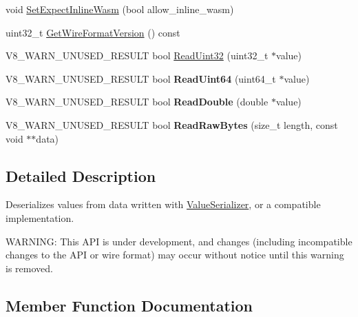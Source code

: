\begin{DoxyCompactItemize}
\item 
void \mbox{\hyperlink{classv8_1_1ValueDeserializer_a2e393ea834f217238fc144f48fd5caf1}{Set\+Expect\+Inline\+Wasm}} (bool allow\+\_\+inline\+\_\+wasm)
\item 
uint32\+\_\+t \mbox{\hyperlink{classv8_1_1ValueDeserializer_aaf8a206c11e0663105e570dd4feb01f9}{Get\+Wire\+Format\+Version}} () const
\item 
V8\+\_\+\+W\+A\+R\+N\+\_\+\+U\+N\+U\+S\+E\+D\+\_\+\+R\+E\+S\+U\+LT bool \mbox{\hyperlink{classv8_1_1ValueDeserializer_a77133b51f7cbad0bdd5faf1f32457abb}{Read\+Uint32}} (uint32\+\_\+t $\ast$value)
\item 
\mbox{\label{classv8_1_1ValueDeserializer_a74f27c249055f24d35c5a794fa99276b}} 
V8\+\_\+\+W\+A\+R\+N\+\_\+\+U\+N\+U\+S\+E\+D\+\_\+\+R\+E\+S\+U\+LT bool {\bfseries Read\+Uint64} (uint64\+\_\+t $\ast$value)
\item 
\mbox{\label{classv8_1_1ValueDeserializer_a968968e1a59d9394e866dd11052c61ba}} 
V8\+\_\+\+W\+A\+R\+N\+\_\+\+U\+N\+U\+S\+E\+D\+\_\+\+R\+E\+S\+U\+LT bool {\bfseries Read\+Double} (double $\ast$value)
\item 
\mbox{\label{classv8_1_1ValueDeserializer_af6b0a523960b72a272cfe571dbd7b7f1}} 
V8\+\_\+\+W\+A\+R\+N\+\_\+\+U\+N\+U\+S\+E\+D\+\_\+\+R\+E\+S\+U\+LT bool {\bfseries Read\+Raw\+Bytes} (size\+\_\+t length, const void $\ast$$\ast$data)
\end{DoxyCompactItemize}


\subsection{Detailed Description}
Deserializes values from data written with \mbox{\hyperlink{classv8_1_1ValueSerializer}{Value\+Serializer}}, or a compatible implementation.

W\+A\+R\+N\+I\+NG\+: This A\+PI is under development, and changes (including incompatible changes to the A\+PI or wire format) may occur without notice until this warning is removed. 

\subsection{Member Function Documentation}
\mbox{\label{classv8_1_1ValueDeserializer_aaf8a206c11e0663105e570dd4feb01f9}} 
